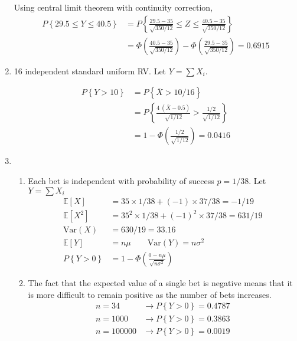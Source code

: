 \begin{enumerate}
		Using central limit theorem with continuity correction,
		\begin{align}
			P\left\{29.5 \leq Y \leq 40.5 \right\} &= P\left\{\frac{29.5 - 35}{\sqrt{350/12}} \leq Z \leq \frac{40.5 - 35}{\sqrt{350/12}}\right\} \nonumber \\
			&= \Phi \left( \frac{40.5 - 35}{\sqrt{350/12}} \right) - \Phi\left(\frac{29.5 - 35}{\sqrt{350/12}}\right) = 0.6915
		\end{align}
	
	
	\item 16 independent standard uniform RV. Let $ Y = \sum X_i  $.
	
		\begin{align}
			P \left\{Y > 10 \right\} &= P \left\{ \overline{X} > 10/16 \right\} \nonumber \\
			&= P \left\{ \frac{4\ (\overline{X} - 0.5)}{\sqrt{1/12}}> \frac{1/2}{\sqrt{1/12}} \right\} \nonumber \\
			&= 1 - \Phi\left( \frac{1/2}{\sqrt{1/12}} \right) = 0.0416
		\end{align}
	
	
	\item 
		\begin{enumerate}
			\item Each bet is independent with probability of success $ p = 1/38 $. Let $ Y = \sum X_i $\\
			\begin{align}
				\mathbb{E}[X] &= 35 \times 1/38 + (-1) \times 37/38 = -1/19 \\
				\mathbb{E}[X^2] &= 35^2 \times 1/38 + (-1)^2 \times 37/38 = 631/19 \nonumber \\
				\mathrm{Var}(X) &= 630/19 = 33.16 \\
				\mathbb{E}[Y] &= n\mu \qquad \mathrm{Var}(Y) = n\sigma^2 \nonumber \\
				P \left\{ Y > 0 \right\} &= 1 - \Phi \left( \frac{0 - n\mu}{\sqrt{n\sigma^2}} \right) \nonumber
			\end{align}
			
			\item The fact that the expected value of a single bet is negative means that it is more difficult to remain positive as the number of bets increases.
			\begin{align}
				n = 34 &\to P \left\{ Y > 0 \right\} = 0.4787 \nonumber \\
				n = 1000 &\to P \left\{ Y > 0 \right\} = 0.3863 \nonumber \\
				n = 100000 &\to P \left\{ Y > 0 \right\} = 0.0019 \nonumber
			\end{align}
		\end{enumerate}
	 

\end{enumerate}
